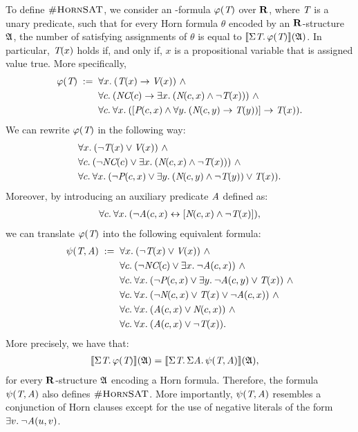 \begin{exa}
To define $\textsc{\#HornSAT}$, we consider an \so-formula $\varphi(\textit{T})$ over $\mathbf{R}$, where $\textit{T}$ is a unary predicate, such that for every Horn formula $\theta$ encoded by an $\mathbf{R}$-structure $\mathfrak{A}$, the number of satisfying assignments of $\theta$ is equal to ${\llbracket{}{\Sigma{\textit{T}}.\, \varphi(\textit{T})}\rrbracket}(\mathfrak{A})$. In particular, $\textit{T}(x)$ holds if, and only if, $x$ is a propositional variable that is assigned value true.  More specifically, 
\begin{align*}
\varphi(\pT) \; :=\;\;  & \fa{x} (\pT(x) \to \pV(x)) \ \wedge\\
& \fa{c}  (\pNC(c) \to \ex{x} (\pN(c,x) \wedge \neg \pT(x))) \ \wedge\\
& \fa{c} \fa{x} ([\pP(c,x) \wedge \fa{y} (\pN(c,y) \to \pT(y))] \to \pT(x)).
\end{align*}
We can rewrite $\varphi(\textit{T})$ in the following way:
\begin{align*}
& \fa{x}  (\neg \pT(x) \vee \pV(x)) \ \wedge\\
& \fa{c}  (\neg \pNC(c) \vee \ex{x} (\pN(c,x) \wedge \neg \pT(x)))\ \wedge\\
& \fa{c} \fa{x}  (\neg \pP(c,x) \vee \ex{y} (\pN(c,y) \wedge \neg \pT(y)) \vee \pT(x)).
\end{align*}
Moreover, by introducing an auxiliary predicate $\textit{A}$ defined as:
\begin{align*}
\forall{c}.\: \forall{x}.\:  (\neg \textit{A}(c,x) \leftrightarrow [\textit{N}(c,x) \wedge \neg \textit{T}(x)]),
\end{align*}
we can translate $\varphi(\textit{T})$ into the following equivalent formula:
\begin{align*}
\psi(\pT,\pA) \; := \;\;  & \fa{x} (\neg \pT(x) \vee \pV(x)) \ \wedge\\
& \fa{c} (\neg \textit{NC}(c) \vee \ex{x} \neg \textit{A}(c,x)) \ \wedge\\
& \fa{c} \fa{x}  (\neg \textit{P}(c,x) \vee \ex{y} \neg \textit{A}(c,y) \vee \textit{T}(x)) \ \wedge\\
& \fa{c} \fa{x} (\neg \textit{N}(c,x) \vee \textit{T}(x) \vee \neg \textit{A}(c,x)) \ \wedge \\
& \fa{c} \fa{x} (\textit{A}(c,x) \vee \textit{N}(c,x)) \ \wedge\\
& \fa{c} \fa{x} (\textit{A}(c,x) \vee \neg\textit{T}(x)).
\end{align*}
More precisely, we have that:
\begin{align*}
{\llbracket{}{\Sigma{\textit{T}}.\, \varphi(\textit{T})}\rrbracket}(\mathfrak{A}) &= {\llbracket{}{\Sigma{\textit{T}}.\, \Sigma{\textit{A}}.\, \psi(\textit{T},\textit{A})}\rrbracket}(\mathfrak{A}),
\end{align*}
 for every $\mathbf{R}$-structure $\mathfrak{A}$ encoding a Horn formula. Therefore, the formula $\psi(\textit{T},\textit{A})$ also defines $\textsc{\#HornSAT}$. More importantly, $\psi(\textit{T},\textit{A})$ resembles a conjunction of Horn clauses except for the use of negative literals of the form $\exists{v}.\: \neg \textit{A}(u,v)$.
\end{exa}
